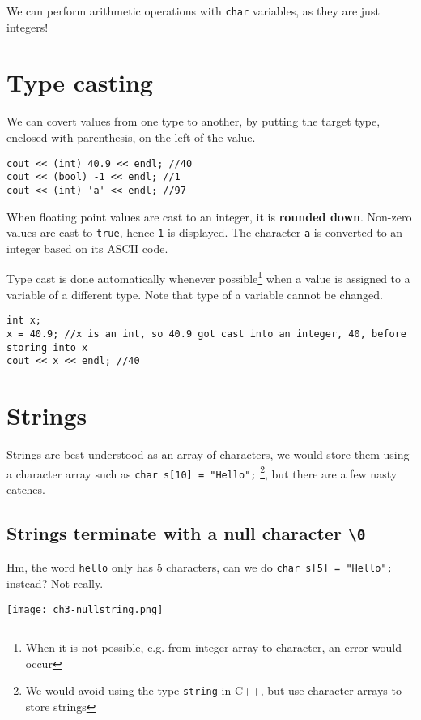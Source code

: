 We can perform arithmetic operations with \texttt{char} variables, as they are just integers! 

\section{Type casting}

We can covert values from one type to another, by putting the target type, enclosed with parenthesis, on the left of the value.

\begin{lstlisting}
cout << (int) 40.9 << endl; //40
cout << (bool) -1 << endl; //1
cout << (int) 'a' << endl; //97
\end{lstlisting}

When floating point values are cast to an integer, it is \textbf{rounded down}. Non-zero values are cast to \texttt{true}, hence \texttt{1} is displayed. The character \texttt{a} is converted to an integer based on its ASCII code.

Type cast is done automatically whenever possible\footnote{When it is not possible, e.g. from integer array to character, an error would occur} when a value is assigned to a variable of a different type. Note that type of a variable cannot be changed. 

\begin{lstlisting}
int x;
x = 40.9; //x is an int, so 40.9 got cast into an integer, 40, before storing into x
cout << x << endl; //40
\end{lstlisting}

\section{Strings}

Strings are best understood as an array of characters, we would store them using a character array such as  \texttt{char s[10] = "Hello";} \footnote{We would avoid using the type \texttt{string} in C++, but use character arrays to store strings}, but there are a few nasty catches.

\subsection*{Strings terminate with a null character \texttt{\textbackslash 0}}

Hm, the word \texttt{hello} only has 5 characters, can we do \texttt{char s[5] = "Hello";} instead? Not really.

\texttt{[image: ch3-nullstring.png]}

